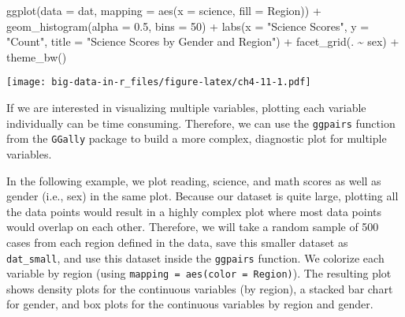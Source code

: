 \documentclass[
]{book}
\newenvironment{Shaded}{\begin{snugshade}}{\end{snugshade}}
\newcommand{\AttributeTok}[1]{\textcolor[rgb]{0.77,0.63,0.00}{#1}}
\newcommand{\DecValTok}[1]{\textcolor[rgb]{0.00,0.00,0.81}{#1}}
\newcommand{\FloatTok}[1]{\textcolor[rgb]{0.00,0.00,0.81}{#1}}
\newcommand{\FunctionTok}[1]{\textcolor[rgb]{0.00,0.00,0.00}{#1}}
\newcommand{\NormalTok}[1]{#1}
\newcommand{\SpecialCharTok}[1]{\textcolor[rgb]{0.00,0.00,0.00}{#1}}
\newcommand{\StringTok}[1]{\textcolor[rgb]{0.31,0.60,0.02}{#1}}
\begin{document}
\begin{Shaded}
\begin{Highlighting}[]
\FunctionTok{ggplot}\NormalTok{(}\AttributeTok{data =}\NormalTok{ dat,}
       \AttributeTok{mapping =} \FunctionTok{aes}\NormalTok{(}\AttributeTok{x =}\NormalTok{ science, }\AttributeTok{fill =}\NormalTok{ Region)) }\SpecialCharTok{+}
  \FunctionTok{geom\_histogram}\NormalTok{(}\AttributeTok{alpha =} \FloatTok{0.5}\NormalTok{, }\AttributeTok{bins =} \DecValTok{50}\NormalTok{) }\SpecialCharTok{+}
  \FunctionTok{labs}\NormalTok{(}\AttributeTok{x =} \StringTok{"Science Scores"}\NormalTok{, }\AttributeTok{y =} \StringTok{"Count"}\NormalTok{,}
       \AttributeTok{title =} \StringTok{"Science Scores by Gender and Region"}\NormalTok{) }\SpecialCharTok{+}
  \FunctionTok{facet\_grid}\NormalTok{(. }\SpecialCharTok{\textasciitilde{}}\NormalTok{ sex) }\SpecialCharTok{+}
  \FunctionTok{theme\_bw}\NormalTok{()}
\end{Highlighting}
\end{Shaded}

\texttt{[image: big-data-in-r\_files/figure-latex/ch4-11-1.pdf]}

If we are interested in visualizing multiple variables, plotting each variable individually can be time consuming. Therefore, we can use the \texttt{ggpairs} function from the \texttt{GGally} package to build a more complex, diagnostic plot for multiple variables.

In the following example, we plot reading, science, and math scores as well as gender (i.e., sex) in the same plot. Because our dataset is quite large, plotting all the data points would result in a highly complex plot where most data points would overlap on each other. Therefore, we will take a random sample of 500 cases from each region defined in the data, save this smaller dataset as \texttt{dat\_small}, and use this dataset inside the \texttt{ggpairs} function. We colorize each variable by region (using \texttt{mapping\ =\ aes(color\ =\ Region)}). The resulting plot shows density plots for the continuous variables (by region), a stacked bar chart for gender, and box plots for the continuous variables by region and gender.
\end{document}
